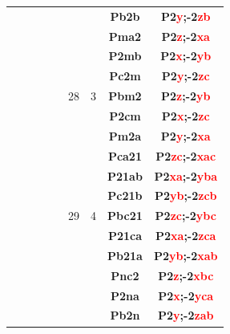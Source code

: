\documentclass{article}      %
\begin{document}
\begin{small}
\begin{longtable}[c]{|c|c|c|c|c|c|c|c|c|}
          &  & & & &  & &\textbf{Pb2b}         &\textbf{P2\textcolor{red}{y};-2\textcolor{red}{zb}}\\\cline{6-9}          
          &  & & & &  & &\textbf{Pma2}         &\textbf{P2\textcolor{red}{z};-2\textcolor{red}{xa}}\\\cline{8-9}          
          &  & & & &  & &\textbf{P2mb}         &\textbf{P2\textcolor{red}{x};-2\textcolor{red}{yb}}\\\cline{8-9}          
          &  & & & &  & &\textbf{Pc2m}         &\textbf{P2\textcolor{red}{y};-2\textcolor{red}{zc}}\\\cline{8-9}          
	  &  & & & &\textrm{28}  &\textrm{3} &\textbf{Pbm2}         &\textbf{P2\textcolor{red}{z};-2\textcolor{red}{yb}}\\\cline{8-9}          
          &  & & & &  & &\textbf{P2cm}         &\textbf{P2\textcolor{red}{x};-2\textcolor{red}{zc}}\\\cline{8-9}          
          &  & & & &  & &\textbf{Pm2a}         &\textbf{P2\textcolor{red}{y};-2\textcolor{red}{xa}}\\\cline{6-9}        
          &  & & & &  & &\textbf{Pca21}       &\textbf{P2\textcolor{red}{zc};-2\textcolor{red}{xac}}\\\cline{8-9}        
          &  & & & &  & &\textbf{P21ab}       &\textbf{P2\textcolor{red}{xa};-2\textcolor{red}{yba}}\\\cline{8-9}        
          &  & & & &  & &\textbf{Pc21b}       &\textbf{P2\textcolor{red}{yb};-2\textcolor{red}{zcb}}\\\cline{8-9}        
	  &  & & & &\textrm{29}  &\textrm{4} &\textbf{Pbc21}       &\textbf{P2\textcolor{red}{zc};-2\textcolor{red}{ybc}}\\\cline{8-9}        
          &  & & & &  & &\textbf{P21ca}       &\textbf{P2\textcolor{red}{xa};-2\textcolor{red}{zca}}\\\cline{8-9}        
          &  & & & &  & &\textbf{Pb21a}       &\textbf{P2\textcolor{red}{yb};-2\textcolor{red}{xab}}\\\cline{6-9}        
          &  & & & &  & &\textbf{Pnc2}         &\textbf{P2\textcolor{red}{z};-2\textcolor{red}{xbc}}\\\cline{8-9}         
          &  & & & &  & &\textbf{P2na}         &\textbf{P2\textcolor{red}{x};-2\textcolor{red}{yca}}\\\cline{8-9}         
          &  & & & &  & &\textbf{Pb2n}         &\textbf{P2\textcolor{red}{y};-2\textcolor{red}{zab}}\\\cline{8-9}         

\end{longtable}
\end{small}
\end{document}
